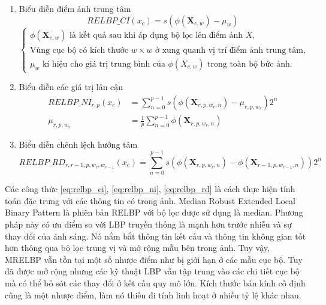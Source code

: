 \begin{enumerate}
    \item Biểu diễn điểm ảnh trung tâm 
    \begin{equation}
        RELBP\_CI(x_c) = s(\phi(\mathbf{X}_{c, w}) - \mu_w)
         \label{eq:relbp_ci}
    \end{equation}
    $\begin{cases}
    \phi(\mathbf{X}_{c,w}) \text{ là kết quả sau khi áp dụng bộ lọc lên điểm ảnh } X, \\
    \text{Vùng cục bộ có kích thước } w \times w \text{ ở xung quanh vị trí điểm ảnh trung tâm}, \\
    \mu_w \text{ kí hiệu cho giá trị trung bình của } \phi(X_{c,w}) \text{ trong toàn bộ bức ảnh}.
\end{cases}$



    \item Biểu diễn các giá trị lân cận
\begin{equation}
    \begin{aligned}
        RELBP\_NI_{r, p}(x_c) &= \sum_{n=0}^{p-1}s(\phi(\mathbf{X}_{r, p, w_r, n}) - \mu_{r, p, w_r}) 2^n \\
        \mu_{r, p, w_r} &= \frac{1}{p}\sum_{n =0}^{p-1}\phi(\mathbf{X}_{r, p, w_r, n})
    \end{aligned}
             \label{eq:relbp_ni}
\end{equation}

    \item Biểu diễn chênh lệch hướng tâm
    \begin{equation}
        RELBP\_RD_{r, r-1, p, w_r, w_{r-1}}(x_c) = \sum_{n=0}^{p-1}s(\phi(\mathbf{X}_{r, p, w_r, n}) - \phi(\mathbf{X}_{r-1, p, w_{r-1}, n}))2^n
             \label{eq:relbp_rd}
\end{equation}
\end{enumerate}

Các công thức \ref{eq:relbp_ci}, \ref{eq:relbp_ni}, \ref{eq:relbp_rd} là cách thực hiện tính toán đặc trưng với các thông tin có trong ảnh. Median Robust Extended Local Binary Pattern là phiên bản RELBP với bộ lọc được sử dụng là median. Phương pháp này có ưu điểm so với LBP truyền thống là mạnh hơn trước nhiễu và sự thay đổi của ánh sáng. Nó nắm bắt thông tin kết cấu và thông tin không gian tốt hơn thông qua bộ lọc trung vị và mở rộng mẫu bên trong ảnh. Tuy vậy, MRELBP vẫn tồn tại một số nhược điểm như bị giới hạn ở các mẫu cục bộ. Tuy đã được mở rộng nhưng các kỹ thuật LBP vẫn tập trung vào các chi tiết cục bộ mà có thể bỏ sót các thay đổi ở kết cấu quy mô lớn. Kích thước bán kính cố định cũng là một nhược điểm, làm nó thiếu đi tính linh hoạt ở nhiều tỷ lệ khác nhau.

